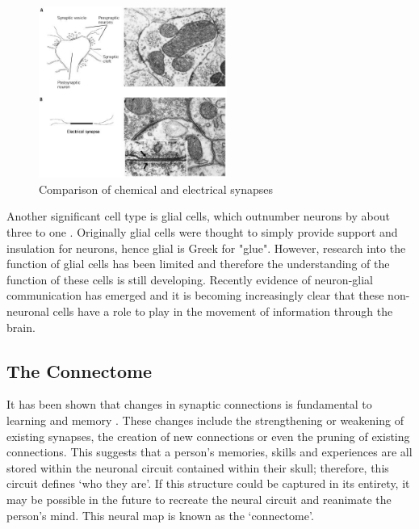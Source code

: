 \documentclass[a4paper, 11pt]{article}
\numberwithin{equation}{section}
\begin{document}
\begin{figure}[h!]
	\centering
	\includegraphics[width=0.55\textwidth]{chemical_vs_electrical}
	\caption[]{Comparison of chemical and electrical synapses\footnotemark}
	\label{chemical_vs_electrical}
\end{figure}

Another significant cell type is glial cells, which outnumber neurons by about three to one \cite{glial_number}. Originally glial cells were thought to simply provide support and insulation for neurons, hence glial is Greek for "glue". However, research into the function of glial cells has been limited and therefore the understanding of the function of these cells is still developing. Recently evidence of neuron-glial communication has emerged \cite{fields2002new} and it is becoming increasingly clear that these non-neuronal cells have a role to play in the movement of information through the brain.

\subsection{The Connectome}
\label{connectome}
It has been shown that changes in synaptic connections is fundamental to learning and memory \cite{mayford2012synapses}\cite{rogerson2014synaptic}. These changes include the strengthening or weakening of existing synapses, the creation of new connections or even the pruning of existing connections. This suggests that a person's memories, skills and experiences are all stored within the neuronal circuit contained within their skull; therefore, this circuit defines `who they are'. If this structure could be captured in its entirety, it may be possible in the future to recreate the neural circuit and reanimate the person's mind. This neural map is known as the `connectome'.
\end{document}
